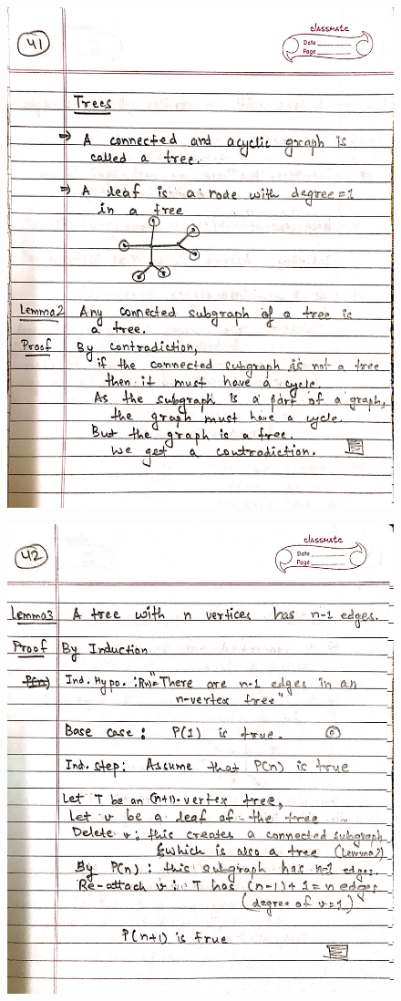 \begin{figure}[H]
    \centering
    \includegraphics[scale=0.25]{"./MIT 6.042J/MIT_6042J_041"}
\end{figure}
\newpage
\begin{figure}[H]
    \centering
    \includegraphics[scale=0.25]{"./MIT 6.042J/MIT_6042J_042"}
\end{figure}
